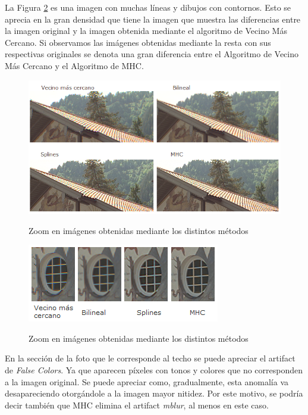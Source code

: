 \documentclass[a4paper]{article}
\begin{document}
La Figura \ref{imagen12} es una imagen con muchas l\'ineas y dibujos con contornos. Esto se aprecia en la gran densidad que tiene la imagen que muestra las diferencias entre la imagen original y la imagen obtenida  mediante el algoritmo de Vecino M\'as Cercano. Si observamos las im\'agenes obtenidas mediante la resta con sus respectivas originales se denota una gran diferencia entre el Algoritmo de Vecino M\'as Cercano y el Algoritmo de MHC.\\

\newpage

\begin{figure}[h!]
    \caption{Zoom en imágenes obtenidas mediante los distintos métodos}
    \begin{center}
    \includegraphics[scale=0.9]{imagenes/comparacion/12/techo}
    \label{imagen12}
  \end{center}
\end{figure}


\begin{figure}[h!]
    \caption{Zoom en imágenes obtenidas mediante los distintos métodos}
    \begin{center}
    \includegraphics[scale=1.1]{imagenes/comparacion/12/ventanita}
    \label{imagen12}
  \end{center}
\end{figure}

En la secci\'on de la foto que le corresponde al techo se puede apreciar el artifact de \emph{False Colors}. Ya que aparecen p\'ixeles con tonos y colores que no corresponden a la imagen original. Se puede apreciar como, gradualmente, esta anomal\'ia va desapareciendo otorg\'andole a la imagen mayor nitidez. Por este motivo, se podr\'ia decir tambi\'en que MHC elimina el artifact \emph{mblur}, al menos en este caso.\\
\end{document}
